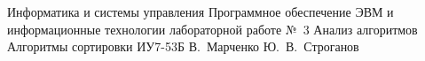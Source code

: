 \makereporttitle
    {Информатика и системы управления}
    {Программное обеспечение ЭВМ и информационные технологии}
    {лабораторной работе №~3}
    {Анализ алгоритмов}
    {Алгоритмы сортировки}
    {}
    {ИУ7-53Б}
    {В.~Марченко}
    {Ю.~В.~Строганов}
    {}
